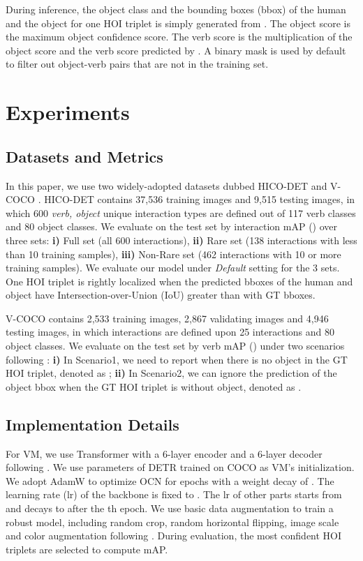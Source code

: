 \documentclass[letterpaper]{article} \usepackage{aaai22}  \usepackage{times}  \usepackage{helvet}  \usepackage{courier}  \usepackage[hyphens]{url}  \usepackage{graphicx} \urlstyle{rm} \def\UrlFont{\rm}  \usepackage{natbib}  \usepackage{caption} \DeclareCaptionStyle{ruled}{labelfont=normalfont,labelsep=colon,strut=off} \frenchspacing  \setlength{\pdfpagewidth}{8.5in}  \setlength{\pdfpageheight}{11in}  \usepackage{algorithm}
\begin{document}
During inference, the object class and the bounding boxes (bbox) of the human and the object for one HOI triplet is simply generated from . The object score is the maximum object confidence score. The verb score is the multiplication of the object score and the verb score predicted by . A binary mask is used by default to filter out object-verb pairs that are not in the training set.



\section{Experiments}
\subsection{Datasets and Metrics} 
In this paper, we use two widely-adopted datasets dubbed HICO-DET \cite{chao2015hico} and V-COCO \cite{gupta2015VisualSemanticRole}. HICO-DET contains 37,536 training images and 9,515 testing images, in which 600 \textit{verb, object} unique interaction types are defined out of 117 verb classes and 80 object classes. We evaluate on the test set by interaction mAP () over three sets: \textbf{i)} Full set (all 600 interactions), \textbf{ii)} Rare set (138 interactions with less than 10 training samples), \textbf{iii)} Non-Rare set (462 interactions with 10 or more training samples). We evaluate our model under \textit{Default} setting for the 3 sets. One HOI triplet is rightly localized when the predicted bboxes of the human and object have Intersection-over-Union (IoU) greater than  with GT bboxes. 

V-COCO contains 2,533 training images, 2,867 validating images and 4,946 testing images, in which interactions are defined upon 25 interactions and 80 object classes. We evaluate on the test set by verb mAP () under two scenarios following \cite{kim2021hotr,tamura2021qpic}: \textbf{i)} In Scenario1, we need to report when there is no object in the GT HOI triplet, denoted as ; \textbf{ii)} In Scenario2, we can ignore the prediction of the object bbox when the GT HOI triplet is without object, denoted as .



\subsection{Implementation Details} For VM, we use Transformer with a 6-layer encoder and a 6-layer decoder following \cite{carion2020DETR}. We use parameters of DETR trained on COCO \cite{lin2014MSCOCO} as VM's initialization. We adopt AdamW \cite{loshchilov2018adamW} to optimize OCN for  epochs with a weight decay of . The learning rate (lr) of the backbone is fixed to . The lr of other parts starts from  and decays to  after the th epoch. We use basic data augmentation to train a robust model, including random crop, random horizontal flipping, image scale and color augmentation following \cite{carion2020DETR,liao2020ppdm}. During evaluation, the most confident  HOI triplets are selected to compute mAP. 
\end{document}
